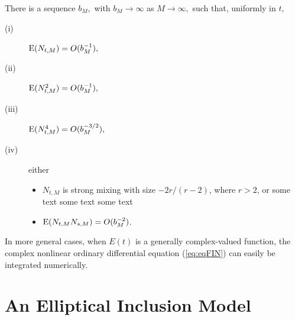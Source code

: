 \documentclass{article}
\begin{document}
\begin{lemma}

There is a sequence $b_{M},$ with $%
b_{M}\rightarrow \infty $ as $M\rightarrow \infty ,$ such that, uniformly in
$t,$

\begin{description}
\item[{\rm (i)}\phantom{ii}] $\hbox{\rm E}( N_{t,M}) =O(b_{M}^{-1}),$

\item[{\rm (ii)}\phantom{i}] $\hbox{\rm E}( N_{t,M}^{2}) =O(b_{M}^{-1}),$

\item[{\rm (iii)}] $\hbox{\rm E}( N_{t,M}^{4}) =O(b_{M}^{-3/2}),$

\item[{\rm (iv)}\phantom{\hspace*{.5pt}}] either
\begin{itemize}
\item[{\rm (a)}] $N_{t,M}$ is strong mixing with size $-2r/(r-2)$, where $r>2$, or some text some text some text 

\item[{\rm (b)}] $\hbox{\rm E}( N_{t,M}N_{s,M}) =O(b_{M}^{-2})$.
\end{itemize}
\end{description}
\end{lemma}
In more general cases, when $E(t)$ is a generally complex-valued
function, the complex nonlinear ordinary differential
equation (\ref{eq:eqFIN}) can easily be integrated numerically.


\section{An Elliptical Inclusion Model}
\end{document}
